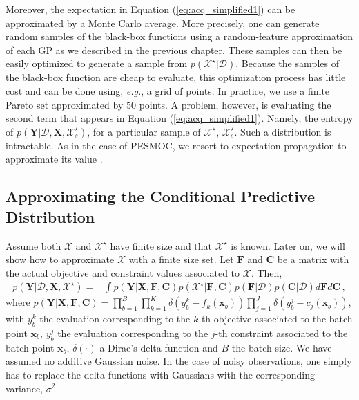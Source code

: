 Moreover, the expectation in Equation (\ref{eq:acq_simplified1}) can be approximated by a Monte Carlo average. 
More precisely, one can generate random samples of the black-box functions using a random-feature 
approximation of each GP as we described in the previous chapter. These samples can then be easily 
optimized to generate a sample from $p(\mathcal{X}^\star|\mathcal{D})$.  
Because the samples of the black-box function are cheap to evaluate, this optimization process has little cost 
and can be done using, \emph{e.g.}, a grid of points. In practice, we use a finite Pareto set approximated by 
$50$ points. A problem, however, is evaluating the second term that appears in Equation (\ref{eq:acq_simplified1}). Namely, 
the entropy of $p(\mathbf{Y}|\mathcal{D},\mathbf{X},\mathcal{X}^\star_s)$, for
a particular sample of $\mathcal{X}^\star$, $\mathcal{X}^\star_s$. Such a distribution is intractable.
As in the case of PESMOC, we resort to expectation propagation to approximate its value \citep{minka2001expectation}.

\subsection{Approximating the Conditional Predictive Distribution}

Assume both $\mathcal{X}$ and $\mathcal{X}^\star$ have finite size and that $\mathcal{X}^\star$ is known. 
Later on, we will show how to approximate $\mathcal{X}$ with a finite size set.
Let $\mathbf{F}$ and $\mathbf{C}$ be a matrix with the actual
objective and constraint values associated to $\mathcal{X}$. Then,
\begin{align}
p(\mathbf{Y}|\mathcal{D},\mathbf{X},\mathcal{X}^\star) = & 
	\int p(\mathbf{Y}|\mathbf{X},\mathbf{F},\mathbf{C}) p(\mathcal{X}^\star|\mathbf{F},\mathbf{C})
	p(\mathbf{F}|\mathcal{D}) p(\mathbf{C}|\mathcal{D}) d\mathbf{F} d \mathbf{C}\,,
	\label{eq:conditional_pred1}
\end{align}
where $p(\mathbf{Y}|\mathbf{X},\mathbf{F},\mathbf{C})=\prod_{b=1}^B \prod_{k=1}^K 
\delta(y^k_b-f_k(\mathbf{x}_b)) \prod_{j=1}^J \delta(y^j_b - c_j(\mathbf{x}_b))$, with
$y^k_b$ the evaluation corresponding to the $k$-th objective associated to the batch point $\mathbf{x}_b$,
$y^j_b$ the evaluation corresponding to the $j$-th constraint associated to the batch point $\mathbf{x}_b$,
$\delta(\cdot)$ a Dirac's delta function and $B$ the batch size.
We have assumed no additive Gaussian noise. In the case of noisy observations, one
simply has to replace the delta functions with Gaussians with
the corresponding variance, $\sigma^2$.

